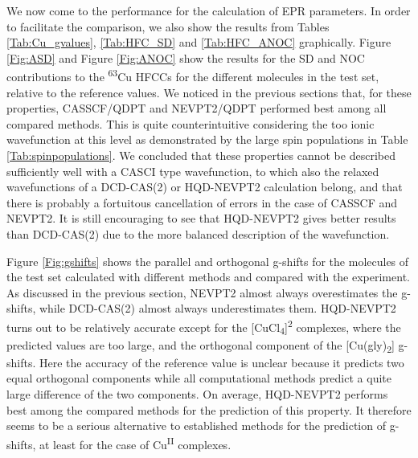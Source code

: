 We now come to the performance for the calculation of EPR parameters. In order to facilitate the comparison, we also show the results from Tables \ref{Tab:Cu_gvalues}, \ref{Tab:HFC_SD} and \ref{Tab:HFC_ANOC} graphically. Figure \ref{Fig:ASD} and Figure \ref{Fig:ANOC} show the results for the SD and NOC contributions to the \textsuperscript{63}Cu HFCCs for the different molecules in the test set, relative to the reference values. We noticed in the previous sections that, for these properties, CASSCF/QDPT and NEVPT2/QDPT performed best among all compared methods. This is quite counterintuitive considering the too ionic wavefunction at this level as demonstrated by the large spin populations in Table \ref{Tab:spinpopulations}. We concluded that these properties cannot be described sufficiently well with a CASCI type wavefunction, to which also the relaxed wavefunctions of a DCD-CAS(2) or HQD-NEVPT2 calculation belong, and that there is probably a fortuitous cancellation of errors in the case of CASSCF and NEVPT2. It is still encouraging to see that HQD-NEVPT2 gives better results than DCD-CAS(2) due to the more balanced description of the wavefunction.

Figure \ref{Fig:gshifts} shows the parallel and orthogonal g-shifts for the molecules of the test set calculated with different methods and compared with the experiment. As discussed in the previous section, NEVPT2 almost always overestimates the g-shifts, while DCD-CAS(2) almost always underestimates them. HQD-NEVPT2 turns out to be relatively accurate except for the [CuCl\textsubscript{4}]\textsuperscript{2\textminus} complexes, where the predicted values are too large, and the orthogonal component of the [Cu(gly)\textsubscript{2}] g-shifts. Here the accuracy of the reference value is unclear because it predicts two equal orthogonal components while all computational methods predict a quite large difference of the two components. On average, HQD-NEVPT2 performs best among the compared methods for the prediction of this property. It therefore seems to be a serious alternative to established methods for the prediction of g-shifts, at least for the case of Cu\textsuperscript{II} complexes.

